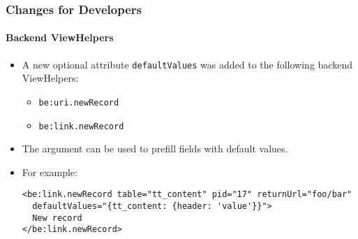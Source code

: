 %

\begin{frame}[fragile]
	\frametitle{Changes for Developers}
	\framesubtitle{Backend ViewHelpers}

	\lstset{basicstyle=\tiny\ttfamily}

	\begin{itemize}
		\item A new optional attribute \texttt{defaultValues} was added to the following
			backend ViewHelpers:

			\begin{itemize}\smaller
				\item \texttt{be:uri.newRecord}
				\item \texttt{be:link.newRecord}
			\end{itemize}\normalsize

		\item The argument can be used to prefill fields with default values.
		\item For example:
\begin{lstlisting}
<be:link.newRecord table="tt_content" pid="17" returnUrl="foo/bar"
  defaultValues="{tt_content: {header: 'value'}}">
  New record
</be:link.newRecord>
\end{lstlisting}
	\end{itemize}

\end{frame}

